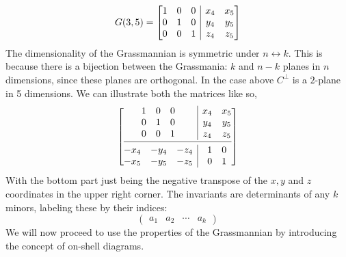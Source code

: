 \documentclass[letter,11pt]{article}
\begin{document}
\begin{equation}G(3,5) = 
\left[ \begin{array}{@{}c|c@{}}
	\begin{matrix}
		1 & 0 &  0 \\
		0 & 1 &  0 \\
		0 & 0 &  1 \\
	\end{matrix} 
	& 	\begin{matrix}
		x_4 & x_5  \\
		y_4 & y_5  \\
		z_4 & z_5  \\
	\end{matrix}  \\
\end{array} \right]
\end{equation}
The dimensionality of the Grassmannian is symmetric under $n\leftrightarrow k$. This is because there is a bijection between the Grassmania: $k$ and $n-k$ planes in $n$ dimensions, since these planes are orthogonal. In the case above $C^{\perp}$ is a $2$-plane in 5 dimensions. We can illustrate both the matrices like so,
\begin{equation}
	\left[ \begin{array}{@{}c|c@{}}
		\begin{matrix}
			1 & 0 &  0 \\
			0 & 1 &  0 \\
			0 & 0 &  1 \\
		\end{matrix} 
		& 	\begin{matrix}
			x_4 & x_5  \\
			y_4 & y_5  \\
			z_4 & z_5  \\
		\end{matrix}  \\
	\cmidrule[0.4pt]{1-2}
		\begin{matrix}
		-x_4 & -y_4 & -z_4  \\
		-x_5 & -y_5 & -z_5 \\
	\end{matrix} 
	& 	\begin{matrix}
	1 & 0  \\
	0 & 1  \\
\end{matrix} 
	\end{array} \right]
\end{equation}
With the bottom part just being the negative transpose of the $x,y$ and $z$ coordinates in the upper right corner. The invariants are determinants of any $k$ minors, labeling these by their indices:
\begin{equation}
\begin{pmatrix}
a_1&a_2&\cdots &a_k
\end{pmatrix}
\end{equation}
We will now proceed to use the properties of the Grassmannian by introducing the concept of on-shell diagrams.
\newpage
\end{document}
